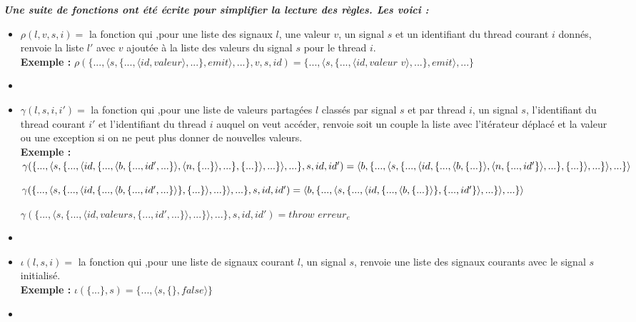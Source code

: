 \documentclass[10pt,a4paper]{article}
\begin{document}
				
				\textbf{\textit{Une suite de fonctions ont été écrite pour simplifier la lecture des règles. Les voici :}}
				\smallbreak
				\begin{itemize}
					\item[] $\rho(l,v,s,i) =$ la fonction qui ,pour une liste des signaux $l$, une valeur $v$, un signal $s$ et un identifiant du thread courant $i$ donnés, renvoie la liste $l'$ avec $v$ ajoutée à la liste des valeurs du signal $s$ pour le thread $i$.
					\\\textbf{Exemple :} $\rho(\{...,\langle s,\{...,\langle id,valeur\rangle,...\},emit\rangle,...\},v,s,id) = \{...,\langle s,\{...,\langle id,valeur$ $v\rangle,...\},emit\rangle,...\}$
					\item[] 
					
					\item[] $\gamma(l,s,i,i') =$ la fonction qui ,pour une liste de valeurs partagées $l$ classés par signal $s$ et par thread $i$, un signal $s$, l'identifiant du thread courant $i'$ et l'identifiant du thread $i$ auquel on veut accéder, renvoie soit un couple la liste avec l'itérateur déplacé et la valeur ou une exception si on ne peut plus donner de nouvelles valeurs. 
					\\\textbf{Exemple :}
					\\$\gamma(\{...,\langle s,\{...,\langle id,\{...,\langle b,\{...,id',...\}\rangle,\langle n,\{...\}\rangle,...\},\{...\}\rangle,...\}\rangle,...\},s,id,id') = 
					\\\langle b , \{...,\langle s,\{...,\langle id,\{...,\langle b,\{...\}\rangle,\langle n,\{...,id'\}\rangle,...\},\{...\}\rangle,...\}\rangle,...\} \rangle$
					\medbreak
						
					$\gamma(\{...,\langle s,\{...,\langle id,\{...,\langle b,\{...,id',...\}\rangle\},\{...\}\rangle,...\}\rangle,...\},s,id,id') = 
					\\\langle b , \{...,\langle s,\{...,\langle id,\{...,\langle b,\{...\}\rangle\},\{...,id'\}\rangle,...\}\rangle,...\} \rangle$
					\medbreak
						
					$\gamma(\{...,\langle s,\{...,\langle id,valeurs,\{...,id',...\}\rangle,...\}\rangle,...\},s,id,id') = throw$ $erreur_{e}$
					\item[]
					
					\item[] $\iota(l,s,i) =$ la fonction qui ,pour une liste de signaux courant $l$, un signal $s$, renvoie une liste des signaux courants avec le signal $s$ initialisé.
					\\\textbf{Exemple :} $\iota(\{...\},s) = \{...,\langle s,\{\},false\rangle\}$
					\item[]
					

\end{itemize}
\end{document}
